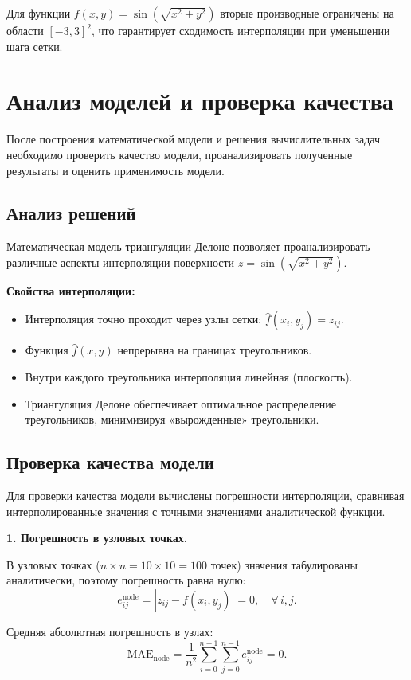 \documentclass[a4paper, 14pt]{extarticle}
\begin{document}
Для функции $f(x,y) = \sin\!\left(\sqrt{x^2+y^2}\right)$ вторые производные ограничены на области $[-3,3]^2$, что гарантирует сходимость интерполяции при уменьшении шага сетки.

\section{Анализ моделей и проверка качества}
После построения математической модели и решения вычислительных задач необходимо проверить качество модели, проанализировать полученные результаты и оценить применимость модели.

\subsection{Анализ решений}

Математическая модель триангуляции Делоне позволяет проанализировать различные аспекты интерполяции поверхности $z = \sin\!\left(\sqrt{x^2 + y^2}\right)$.

\textbf{Свойства интерполяции:}
\begin{itemize}
  \item Интерполяция точно проходит через узлы сетки: $\hat{f}(x_i, y_j) = z_{ij}$.
  \item Функция $\hat{f}(x, y)$ непрерывна на границах треугольников.
  \item Внутри каждого треугольника интерполяция линейная (плоскость).
  \item Триангуляция Делоне обеспечивает оптимальное распределение треугольников, минимизируя «вырожденные» треугольники.
\end{itemize}

\subsection{Проверка качества модели}

Для проверки качества модели вычислены погрешности интерполяции, сравнивая интерполированные значения с точными значениями аналитической функции.

\textbf{1. Погрешность в узловых точках.}

В узловых точках ($n \times n = 10 \times 10 = 100$ точек) значения табулированы аналитически, поэтому погрешность равна нулю:
\[
e^{\text{node}}_{ij} = |z_{ij} - f(x_i, y_j)| = 0, \quad \forall\, i, j.
\]

Средняя абсолютная погрешность в узлах:
\[
\text{MAE}_{\text{node}} = \frac{1}{n^2} \sum_{i=0}^{n-1} \sum_{j=0}^{n-1} e^{\text{node}}_{ij} = 0.
\]
\end{document}
